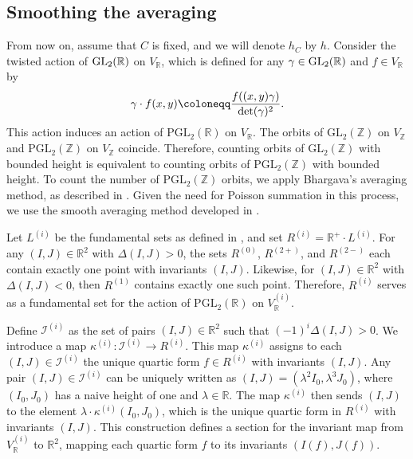 \documentclass{article}
\def\GL{{\rm GL}}
\def\R{{\mathbb R}}
\def \det{{\rm det}}
\begin{document}
\subsection{Smoothing the averaging}
From now on, assume that $C$ is fixed, and we will denote $h_C$ by $h$. Consider the twisted action of $\GL_2(\R)$ on $V_{\R}$, which is defined for any $\gamma \in \GL_2(\R)$ and $f \in V_{\R}$ by
\begin{equation*}
\gamma \cdot f(x,y) \coloneqq \frac{f((x,y)\gamma)}{\det(\gamma)^2}.
\end{equation*}
This action induces an action of $\mathrm{PGL}_2(\mathbb{R})$ on $V_{\mathbb{R}}$. The orbits of $\mathrm{GL}_2(\mathbb{Z})$ on $V_{\mathbb{Z}}$ and $\mathrm{PGL}_2(\mathbb{Z})$ on $V_{\mathbb{Z}}$ coincide. Therefore, counting orbits of $\mathrm{GL}_2(\mathbb{Z})$ with bounded height is equivalent to counting orbits of $\mathrm{PGL}_2(\mathbb{Z})$ with  bounded height. To count the number of $\mathrm{PGL}_2(\mathbb{Z})$ orbits, we apply Bhargava's averaging method, as described in \cite{avg1,avg2}. Given the need for Poisson summation in this process, we use the smooth averaging method developed in \cite{moment}.


Let $L^{(i)}$ be the fundamental sets as defined in \cite{main}, and set $R^{(i)} = \mathbb{R}^{+} \cdot L^{(i)}$. For any $(I, J) \in \mathbb{R}^2$ with $\Delta(I, J) > 0$, the sets $R^{(0)}$, $R^{(2+)}$, and $R^{(2-)}$ each contain exactly one point with invariants $(I, J)$. Likewise, for $(I, J) \in \mathbb{R}^2$ with $\Delta(I, J) < 0$, then $R^{(1)}$ contains exactly one such point. Therefore, $R^{(i)}$ serves as a fundamental set for the action of $\mathrm{PGL}_2(\mathbb{R})$ on $V_{\mathbb{R}}^{(i)}$.

Define $\mathcal{I}^{(i)}$ as the set of pairs $(I, J) \in \mathbb{R}^2$ such that $(-1)^i \Delta(I, J) > 0$. We introduce a map $\kappa^{(i)}: \mathcal{I}^{(i)} \to R^{(i)}$. This map $\kappa^{(i)}$ assigns to each $(I, J) \in \mathcal{I}^{(i)}$ the unique quartic form $f \in R^{(i)}$ with invariants $(I, J)$. Any pair $(I, J) \in \mathcal{I}^{(i)}$ can be uniquely written as $(I, J) = (\lambda^2 I_0, \lambda^3 J_0)$, where $(I_0, J_0)$ has a naive height of one and $\lambda \in \mathbb{R}$. The map $\kappa^{(i)}$ then sends $(I, J)$ to the element $\lambda \cdot \kappa^{(i)}(I_0, J_0)$, which is the unique quartic form in $R^{(i)}$ with invariants $(I, J)$. This construction defines a section for the invariant map from $V_{\mathbb{R}}^{(i)}$ to $\mathbb{R}^2$, mapping each quartic form $f$ to its invariants $(I(f), J(f))$.
\end{document}
